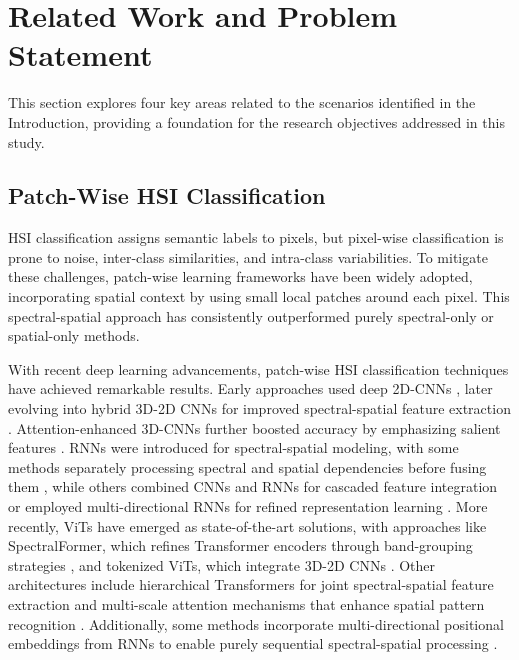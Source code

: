 \section{Related Work and Problem Statement}
\label{related_work}
This section explores four key areas related to the scenarios identified in the Introduction, providing a foundation for the research objectives addressed in this study.
\subsection{Patch-Wise HSI Classification}
HSI classification assigns semantic labels to pixels, but pixel-wise classification is prone to noise, inter-class similarities, and intra-class variabilities. To mitigate these challenges, patch-wise learning frameworks have been widely adopted, incorporating spatial context by using small local patches around each pixel. This spectral-spatial approach has consistently outperformed purely spectral-only or spatial-only methods.

With recent deep learning advancements, patch-wise HSI classification techniques have achieved remarkable results. Early approaches used deep 2D-CNNs \cite{deep-2d-cnn}, later evolving into hybrid 3D-2D CNNs for improved spectral-spatial feature extraction \cite{3d-2d-cnn1}. Attention-enhanced 3D-CNNs further boosted accuracy by emphasizing salient features \cite{attention-cnn}. RNNs were introduced for spectral-spatial modeling, with some methods separately processing spectral and spatial dependencies before fusing them \cite{rnn1}, while others combined CNNs and RNNs for cascaded feature integration \cite{rnn2} or employed multi-directional RNNs for refined representation learning \cite{rnn3}. More recently, ViTs have emerged as state-of-the-art solutions, with approaches like SpectralFormer, which refines Transformer encoders through band-grouping strategies \cite{vit1}, and tokenized ViTs, which integrate 3D-2D CNNs \cite{vit2}. Other architectures include hierarchical Transformers for joint spectral-spatial feature extraction \cite{vit3} and multi-scale attention mechanisms that enhance spatial pattern recognition \cite{vit4}. Additionally, some methods incorporate multi-directional positional embeddings from RNNs to enable purely sequential spectral-spatial processing \cite{vit5}.


